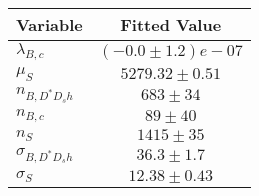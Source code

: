 \begin{tabular}[t]{lc}
\hline
Variable &Fitted Value\\
\hline\hline
$\lambda_{B,c}$&$(-0.0\pm1.2)e-07$\\
\hline
$\mu_S$&$5279.32\pm0.51$\\
\hline
$n_{B, D^* D_s h}$&$683\pm34$\\
\hline
$n_{B,c}$&$89\pm40$\\
\hline
$n_S$&$1415\pm35$\\
\hline
$\sigma_{B, D^* D_s h}$&$36.3\pm1.7$\\
\hline
$\sigma_S$&$12.38\pm0.43$\\
\hline
\end{tabular}